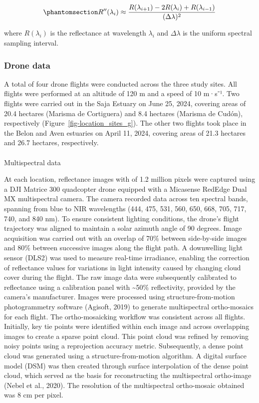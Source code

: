 \documentclass[
  letterpaper,
  11pt,
  english,
  singlespacing,
  headsepline]{MastersDoctoralThesis}
\makeatletter
\let\oldparagraph\paragraph
\renewcommand{\paragraph}{
    \@ifstar
      \xxxParagraphStar
      \xxxParagraphNoStar
  }
\newcommand{\xxxParagraphStar}[1]{\oldparagraph*{#1}\mbox{}}
\newcommand{\xxxParagraphNoStar}[1]{\oldparagraph{#1}\mbox{}}
\makeatother
\begin{document}
\begin{spacing}{1.5}
\begin{equation}\phantomsection\label{eq-SecondDerivative}{
R''(\lambda_i) \approx \frac{R(\lambda_{i+1}) - 2R(\lambda_i) + R(\lambda_{i-1})}{(\Delta \lambda)^2}
}\end{equation}

where \(R(\lambda_i)\) is the reflectance at wavelength \(\lambda_i\)
and \(\Delta \lambda\) is the uniform spectral sampling interval.

\subsubsection{Drone data}\label{drone-data}

A total of four drone flights were conducted across the three study
sites. All flights were performed at an altitude of 120 m and a speed of
10 m·s⁻¹. Two flights were carried out in the Saja Estuary on June 25,
2024, covering areas of 20.4 hectares (Marisma de Cortiguera) and 8.4
hectares (Marisma de Cudón), respectively
(Figure~\ref{fig-location_sites_g}). The other two flights took place in
the Belon and Aven estuaries on April 11, 2024, covering areas of 21.3
hectares and 26.7 hectares, respectively.

\paragraph{Multispectral data}\label{sec-photo}

At each location, reflectance images with of 1.2 million pixels were
captured using a DJI Matrice 300 quadcopter drone equipped with a
Micasense RedEdge Dual MX multispectral camera. The camera recorded data
across ten spectral bands, spanning from blue to NIR wavelengths (444,
475, 531, 560, 650, 668, 705, 717, 740, and 840 nm). To ensure
consistent lighting conditions, the drone's flight trajectory was
aligned to maintain a solar azimuth angle of 90 degrees. Image
acquisition was carried out with an overlap of 70\% between side-by-side
images and 80\% between successive images along the flight path. A
downwelling light sensor (DLS2) was used to measure real-time
irradiance, enabling the correction of reflectance values for variations
in light intensity caused by changing cloud cover during the flight. The
raw image data were subsequently calibrated to reflectance using a
calibration panel with \textasciitilde50\% reflectivity, provided by the
camera's manufacturer. Images were processed using structure-from-motion
photogrammetry software (Agisoft, 2019) to generate multispectral
ortho-mosaics for each flight. The ortho-mosaicking workflow was
consistent across all flights. Initially, key tie points were identified
within each image and across overlapping images to create a sparse point
cloud. This point cloud was refined by removing noisy points using a
reprojection accuracy metric. Subsequently, a dense point cloud was
generated using a structure-from-motion algorithm. A digital surface
model (DSM) was then created through surface interpolation of the dense
point cloud, which served as the basis for reconstructing the
multispectral ortho-image (Nebel et al., 2020). The resolution of the
multispectral ortho-mosaic obtained was 8 cm per pixel.


\end{spacing}
\end{document}
